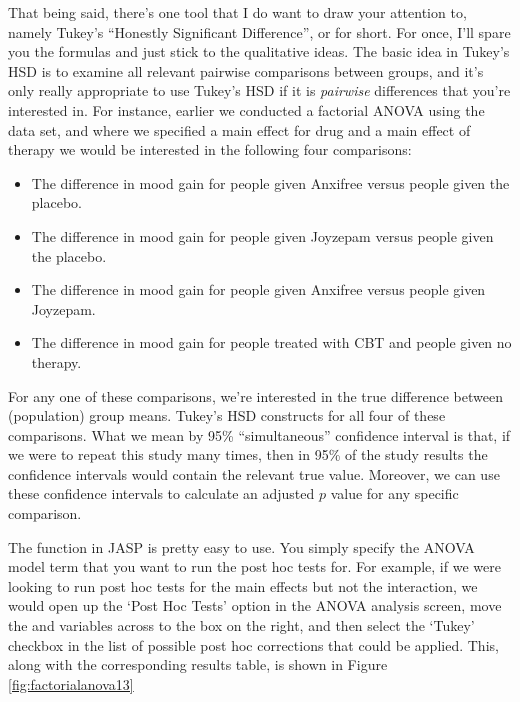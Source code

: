 That being said, there's one tool that I do want to draw your attention to, namely Tukey's ``Honestly Significant Difference'', or  for short. For once, I'll spare you the formulas and just stick to the qualitative ideas. The basic idea in Tukey's HSD is to examine all relevant pairwise comparisons between groups, and it's only really appropriate to use Tukey's HSD if it is {\it pairwise} differences that you're interested in. For instance, earlier we conducted a factorial ANOVA using the  data set, and where we specified a main effect for drug and a main effect of therapy we would be interested in the following four comparisons:
\begin{itemize}
\item The difference in mood gain for people given Anxifree versus people given the placebo.
\item The difference in mood gain for people given Joyzepam versus people given the placebo.
\item The difference in mood gain for people given Anxifree versus people given Joyzepam.
\item The difference in mood gain for people treated with CBT and people given no therapy.
\end{itemize}
For any one of these comparisons, we're interested in the true difference between (population) group means. Tukey's HSD constructs  for all four of these comparisons. What we mean by 95\% ``simultaneous'' confidence interval is that, if we were to repeat this study many times, then in 95\% of the study results the confidence intervals would contain the relevant true value. Moreover, we can use these confidence intervals to calculate an adjusted $p$ value for any specific comparison. 

The  function in JASP is pretty easy to use. You simply specify the ANOVA model term that you want to run the post hoc tests for. For example, if we were looking to run post hoc tests for the main effects but not the interaction, we would open up the `Post Hoc Tests' option in the ANOVA analysis screen, move the  and  variables across to the box on the right, and then select the `Tukey' checkbox in the list of possible post hoc corrections that could be applied.  This, along with the corresponding results table, is shown in Figure \ref{fig:factorialanova13}  

